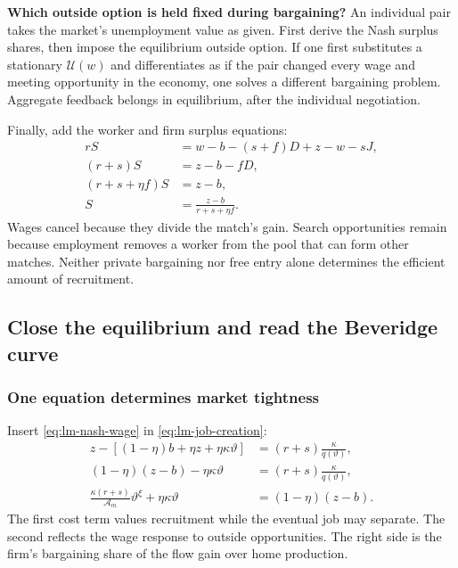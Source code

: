 \begin{redblock}
\textbf{Which outside option is held fixed during bargaining?}
An individual pair takes the market's unemployment value as given. First derive
the Nash surplus shares, then impose the equilibrium outside option. If one
first substitutes a stationary $\mathcal U(w)$ and differentiates as if the
pair changed every wage and meeting opportunity in the economy, one solves
a different bargaining problem. Aggregate feedback belongs in equilibrium,
after the individual negotiation.
\end{redblock}

Finally, add the worker and firm surplus equations:
\begin{align}
 rS&=w-b-(s+f)D+z-w-sJ,\\
 (r+s)S&=z-b-fD,\\
 (r+s+\eta f)S&=z-b,\\
 S&=\frac{z-b}{r+s+\eta f}.
\end{align}
Wages cancel because they divide the match's gain. Search opportunities
remain because employment removes a worker from the pool that can form
other matches. Neither private bargaining nor free entry alone determines
the efficient amount of recruitment.

\subsection{Close the equilibrium and read the Beveridge curve}

\subsubsection{One equation determines market tightness}

Insert \eqref{eq:lm-nash-wage} in \eqref{eq:lm-job-creation}:
\begin{align}
 z-[(1-\eta)b+\eta z+\eta\kappa\vartheta]
   &=(r+s)\frac\kappa{q(\vartheta)},\\
 (1-\eta)(z-b)-\eta\kappa\vartheta
   &=(r+s)\frac\kappa{q(\vartheta)},\\
 \frac{\kappa(r+s)}{\mathcal A_m}\vartheta^\xi
       +\eta\kappa\vartheta&=(1-\eta)(z-b).
 \label{eq:lm-tightness-equilibrium}
\end{align}
The first cost term values recruitment while the eventual job may separate.
The second reflects the wage response to outside opportunities. The right
side is the firm's bargaining share of the flow gain over home production.

